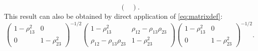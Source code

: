 \documentclass[
  12pt,
  letterpaper]{article}
\numberwithin{equation}{section}
\begin{document}
\begin{itemize}
\begin{equation}
\begin{pmatrix}
\end{pmatrix}.
\label{eq:partialmatrix}
\end{equation}
This result can also be obtained by direct application of \eqref{eq:matrixdef}:
$$\begin{pmatrix}1-\rho_{13}^2 & 0 \\ 0 & 1-\rho_ {23}^2\end{pmatrix}^{-1/2} \begin{pmatrix}  1 - \rho_{13}^2 & \rho_{12} - \rho_{13}\rho_{23} \\ \rho_{12} - \rho_{13}\rho_{23} & 1 - \rho_{23}^2  \end{pmatrix} \begin{pmatrix}1-\rho_{13}^2 & 0 \\ 0 & 1-\rho_ {23}^2\end{pmatrix}^{-1/2}.$$


\end{itemize}
\end{document}
